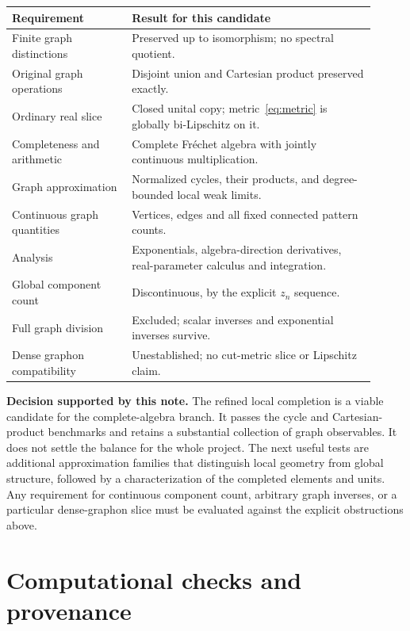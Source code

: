\documentclass[11pt]{article}
\theoremstyle{definition}\newtheorem{definition}[theorem]{Definition}
\begin{document}
\begin{center}\small
\begin{tabular}{p{0.30\linewidth}p{0.61\linewidth}}
\toprule
Requirement & Result for this candidate\\
\midrule
Finite graph distinctions & Preserved up to isomorphism; no spectral quotient.\\
Original graph operations & Disjoint union and Cartesian product preserved exactly.\\
Ordinary real slice & Closed unital copy; metric~\eqref{eq:metric} is globally bi-Lipschitz on it.\\
Completeness and arithmetic & Complete Fr\'echet algebra with jointly continuous multiplication.\\
Graph approximation & Normalized cycles, their products, and degree-bounded local weak limits.\\
Continuous graph quantities & Vertices, edges and all fixed connected pattern counts.\\
Analysis & Exponentials, algebra-direction derivatives, real-parameter calculus and integration.\\
Global component count & Discontinuous, by the explicit $z_n$ sequence.\\
Full graph division & Excluded; scalar inverses and exponential inverses survive.\\
Dense graphon compatibility & Unestablished; no cut-metric slice or Lipschitz claim.\\
\bottomrule
\end{tabular}\end{center}

\textbf{Decision supported by this note.} The refined local completion is a viable candidate for the complete-algebra branch. It passes the cycle and Cartesian-product benchmarks and retains a substantial collection of graph observables. It does not settle the balance for the whole project. The next useful tests are additional approximation families that distinguish local geometry from global structure, followed by a characterization of the completed elements and units. Any requirement for continuous component count, arbitrary graph inverses, or a particular dense-graphon slice must be evaluated against the explicit obstructions above.

\section{Computational checks and provenance}
\end{document}
